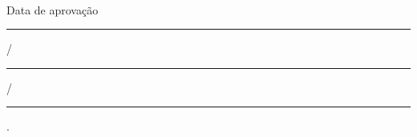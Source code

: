 \begin{folhadeaprovacao}
  \centering
  {\bfseries\imprimirautor\par}
  \vspace{\onelineskip}
  {\bfseries\MakeTextUppercase{\imprimirtitulo}\par}
  \vspace*{\fill}
  \begin{flushright}
    \begin{minipage}{.5\textwidth}
      \imprimirpreambulo\par
      \vspace{\onelineskip}
      \imprimirorientadorRotulo~\imprimirorientador\par
      \vspace{\onelineskip}
      Data de aprovação \rule{1cm}{0.4pt}/\rule{1cm}{0.4pt}/\rule{1.5cm}{0.4pt}.\par
    \end{minipage}
  \end{flushright}
  \vspace*{\fill}
  \setlength{\ABNTEXsignwidth}{11cm}
  \assinatura{\imprimirorientador \\ \imprimirinstituicaoorientador}
  \vspace*{\fill}
  {\bfseries\imprimirlocal\par}
  \clearpage
\end{folhadeaprovacao}
\endgroup
\addtocounter{page}{-1}%


